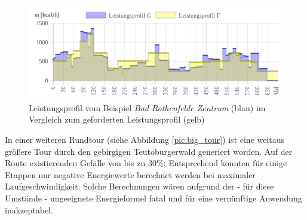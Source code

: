 \documentclass[12pt]{article}
\begin{document}
\begin{figure}[ht]
	\begin{center}
	\includegraphics[width=\textwidth]{pics/png/05_Leistungsprofil_Small_Tour.png}
	\caption{Leistungsprofil vom Beispiel \textit{Bad Rothenfelde Zentrum} (blau) im Vergleich zum geforderten Leistungsprofil (gelb)}
	\label{pic:power_small_tour}
	\end{center}
\end{figure}

\pagebreak

In einer weiteren Rundtour (siehe Abbildung \ref{pic:big_tour}) ist eine weitaus größere Tour durch den gebirgigen Teutoburgerwald generiert worden. Auf der Route existierenden Gefälle von bis zu 30\%; Entsprechend konnten für einige Etappen nur negative Energiewerte berechnet werden bei maximaler Laufgeschwindigkeit. Solche Berechnungen wären aufgrund der - für diese Umstände - ungeeignete Energieformel fatal und für eine vernünftige Anwendung inakzeptabel.
\end{document}
